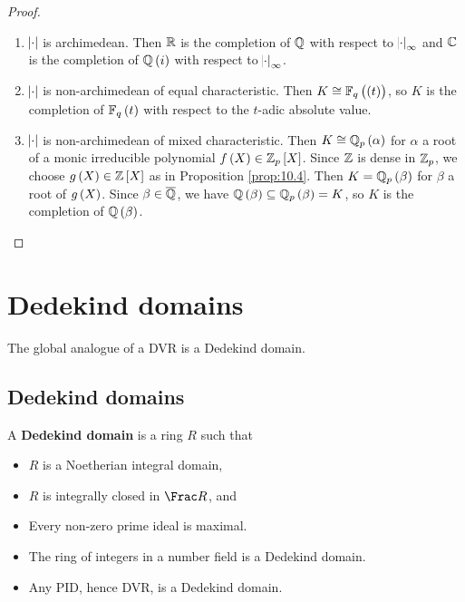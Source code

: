 \begin{proof}
\hfill
\begin{enumerate}[leftmargin=0.5in, label=Case \arabic*.]
\item $ \abs{\cdot} $ is archimedean. Then $ \mathbb{R} $ is the completion of $ \mathbb{Q} $ with respect to $ \abs{\cdot}_\infty $ and $ \mathbb{C} $ is the completion of $ \QQ\br{i} $ with respect to $ \abs{\cdot}_\infty $.
\item $ \abs{\cdot} $ is non-archimedean of equal characteristic. Then $ K \cong \FF_q\br{\br{t}} $, so $ K $ is the completion of $ \FF_q\br{t} $ with respect to the $ t $-adic absolute value.
\item $ \abs{\cdot} $ is non-archimedean of mixed characteristic. Then $ K \cong \QQ_p\br{\alpha} $ for $ \alpha $ a root of a monic irreducible polynomial $ f\br{X} \in \ZZ_p\sbr{X} $. Since $ \mathbb{Z} $ is dense in $ \mathbb{Z}_p $, we choose $ g\br{X} \in \ZZ\sbr{X} $ as in Proposition \ref{prop:10.4}. Then $ K = \QQ_p\br{\beta} $ for $ \beta $ a root of $ g\br{X} $. Since $ \beta \in \overline{\mathbb{Q}} $, we have $ \QQ\br{\beta} \subseteq \QQ_p\br{\beta} = K $, so $ K $ is the completion of $ \QQ\br{\beta} $.
\end{enumerate}
\end{proof}

\pagebreak

\section{Dedekind domains}

The global analogue of a DVR is a Dedekind domain.

\subsection{Dedekind domains}

\begin{definition}
A \textbf{Dedekind domain} is a ring $ R $ such that
\begin{itemize}
\item $ R $ is a Noetherian integral domain,
\item $ R $ is integrally closed in $ \Frac R $, and
\item Every non-zero prime ideal is maximal.
\end{itemize}
\end{definition}

\begin{example*}
\hfill
\begin{itemize}
\item The ring of integers in a number field is a Dedekind domain.
\item Any PID, hence DVR, is a Dedekind domain.
\end{itemize}
\end{example*}

